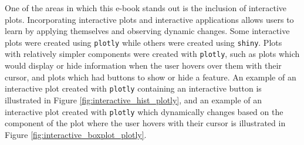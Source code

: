 \documentclass[11pt]{article}
\begin{document}
%
%


One of the areas in which this e-book stands out is the inclusion of interactive plots.
Incorporating interactive plots and interactive applications allows users to learn by applying themselves and observing dynamic changes.
Some interactive plots were created using \texttt{plotly} while others were created using \texttt{shiny}. 
Plots with relatively simpler components were created with \texttt{plotly}, 
such as plots which would display or hide information when the user hovers over them with their cursor,
and plots which had buttons to show or hide a feature.
An example of an interactive plot created with \texttt{plotly} containing an interactive button is illustrated in Figure \ref{fig:interactive_hist_plotly},
and an example of an interactive plot created with \texttt{plotly} which dynamically changes based on the component of the plot where the user hovers with their cursor is illustrated in Figure \ref{fig:interactive_boxplot_plotly}.
\end{document}
